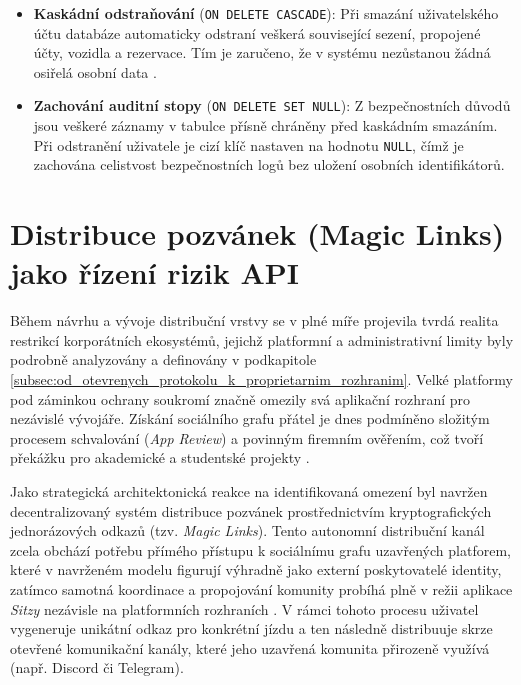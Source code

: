 \documentclass[male,czech,api_bc]{kitheses}
\begin{document}
\begin{itemize}

\item \textbf{Kaskádní odstraňování} (\texttt{ON DELETE CASCADE}): Při smazání uživatelského účtu databáze automaticky odstraní veškerá související sezení, propojené účty, vozidla a rezervace. Tím je zaručeno, že v systému nezůstanou žádná osiřelá osobní data \cite{Paisner25cervence2017}.

\item \textbf{Zachování auditní stopy} (\texttt{ON DELETE SET NULL}): Z bezpečnostních důvodů jsou veškeré záznamy v tabulce  přísně chráněny před kaskádním smazáním. Při odstranění uživatele je cizí klíč nastaven na hodnotu \texttt{NULL}, čímž je zachována celistvost bezpečnostních logů bez uložení osobních identifikátorů.

\end{itemize}

\section{Distribuce pozvánek (Magic Links) jako řízení rizik API}

Během návrhu a vývoje distribuční vrstvy se v plné míře projevila tvrdá realita restrikcí korporátních ekosystémů, jejichž platformní a administrativní limity byly podrobně analyzovány a definovány v podkapitole \vref{subsec:od_otevrenych_protokolu_k_proprietarnim_rozhranim}. Velké platformy pod záminkou ochrany soukromí značně omezily svá aplikační rozhraní pro nezávislé vývojáře. Získání sociálního grafu přátel je dnes podmíněno složitým procesem schvalování (\textit{App Review}) a povinným firemním ověřením, což tvoří překážku pro akademické a studentské projekty \cite{DeNardis2015,MetaDeveloper20251030}.

Jako strategická architektonická reakce na identifikovaná omezení byl navržen decentralizovaný systém distribuce pozvánek prostřednictvím kryptografických jednorázových odkazů (tzv. \textit{Magic Links}). Tento autonomní distribuční kanál zcela obchází potřebu přímého přístupu k sociálnímu grafu uzavřených platforem, které v navrženém modelu figurují výhradně jako externí poskytovatelé identity, zatímco samotná koordinace a propojování komunity probíhá plně v režii aplikace \textit{Sitzy} nezávisle na platformních rozhraních \cite{MagicLinkIF}. V rámci tohoto procesu uživatel vygeneruje unikátní odkaz pro konkrétní jízdu a ten následně distribuuje skrze otevřené komunikační kanály, které jeho uzavřená komunita přirozeně využívá (např. Discord či Telegram).
\end{document}
